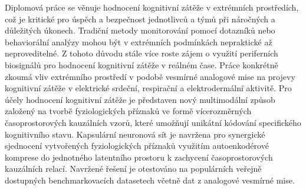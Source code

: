 Diplomová práce se věnuje hodnocení kognitivní zátěže v extrémních prostředích,
což je kritické pro úspěch a bezpečnost jednotlivců a týmů při náročných a
důležitých úkonech. Tradiční metody monitorování pomocí dotazníků nebo
behaviorální analýzy mohou být v extrémních podmínkách nepraktické až
neproveditelné. Z tohoto důvodu stále více roste zájem o využití periferních
biosignálů pro hodnocení kognitivní zátěže v reálném čase. Práce konkrétně
zkoumá vliv extrémního prostředí v podobě vesmírné analogové mise na projevy
kognitivní zátěže v elektrické srdeční, respirační a elektrodermální aktivitě.
Pro účely hodnocení kognitivní zátěže je představen nový multimodální způsob
založený na tvorbě fyziologických příznaků ve formě vícerozměrných
časoprostorových kauzálních vzorů, které umožňují unikátní kódování specifického
kognitivního stavu. Kapsulární neuronová sít je navržena pro synergické
sjednocení vytvořených fyziologických příznaků využitím autoenkodérové komprese
do jednotného latentního prostoru k zachycení časoprostorových kauzálních
relací. Navržené řešení je otestováno na populárních veřejně dostupných
benchmarkovacích datasetech včetně dat z analogové vesmírné mise.

